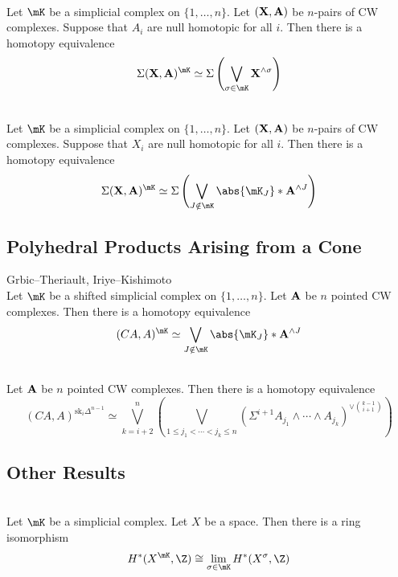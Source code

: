\documentclass[a4paper]{article}
\begin{document}
\begin{crl}{}{}\\
Let $\mK$ be a simplicial complex on $\{1,\dots,n\}$. Let $(\bold{X},\bold{A})$ be $n$-pairs of CW complexes. Suppose that $A_i$ are null homotopic for all $i$. Then there is a homotopy equivalence $$\Sigma(\bold{X},\bold{A})^\mK\simeq\Sigma\left(\bigvee_{\sigma\in\mK}\bold{X}^{\wedge\sigma}\right)$$
\end{crl}

\begin{crl}{}{}\\
Let $\mK$ be a simplicial complex on $\{1,\dots,n\}$. Let $(\bold{X},\bold{A})$ be $n$-pairs of CW complexes. Suppose that $X_i$ are null homotopic for all $i$. Then there is a homotopy equivalence $$\Sigma(\bold{X},\bold{A})^\mK\simeq\Sigma\left(\bigvee_{J\notin\mK}\abs{\mK_J}\ast\bold{A}^{\wedge J}\right)$$
\end{crl}

\subsection{Polyhedral Products Arising from a Cone}
\begin{thm}{Grbic–Theriault, Iriye–Kishimoto}{}\\
Let $\mK$ be a shifted simplicial complex on $\{1,\dots,n\}$. Let $\bold{A}$ be $n$ pointed CW complexes. Then there is a homotopy equivalence $$(CA,A)^\mK\simeq\bigvee_{J\notin\mK}\abs{\mK_J}\ast\bold{A}^{\wedge J}$$
\end{thm}

\begin{eg}{}{}\\
Let $\bold{A}$ be $n$ pointed CW complexes. Then there is a homotopy equivalence $$(CA,A)^{\text{sk}_i\Delta^{n-1}}\simeq\bigvee_{k=i+2}^n\left(\bigvee_{1\leq j_1<\cdots<j_k\leq n}\left(\Sigma^{i+1}A_{j_1}\wedge\cdots\wedge A_{j_k}\right)^{\vee\binom{k-1}{i+1}}\right)$$
\end{eg}

\subsection{Other Results}
\begin{prp}{}{}\\
Let $\mK$ be a simplicial complex. Let $X$ be a space. Then there is a ring isomorphism $$H^\ast(X^\mK,\Z)\cong\lim_{\sigma\in\mK}H^\ast(X^\sigma,\Z)$$
\end{prp}
\end{document}
